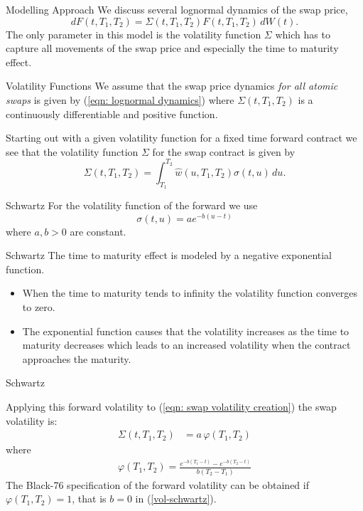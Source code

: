 {Modelling Approach}
We discuss several lognormal dynamics of the swap price,
\begin{equation}
dF(t,T_1,T_2)=\Sigma(t,T_1,T_2)F(t,T_1,T_2)\, dW(t). \label{eqn: lognormal dynamics}
\end{equation}
The only parameter in this model is the volatility function $\Sigma$ which has to capture all movements of the swap price and especially the time to maturity effect.



{Volatility Functions}
We assume that the swap price dynamics \emph{for all atomic swaps} is given by (\ref{eqn: lognormal dynamics})
where $\Sigma(t,T_1,T_2)$ is a continuously differentiable and positive function.

Starting out with a given volatility function for a fixed time forward contract we see that the volatility function $\Sigma$ for the swap contract is given by
\begin{equation}
\Sigma(t,T_1,T_2)=\int_{T_1}^{T_2} \hat{w}(u,T_1,T_2) \sigma(t,u) \, du. \label{eqn: swap volatility creation}
\end{equation}



{Schwartz}
For the volatility function of the forward we use
\begin{equation}\label{vol-schwartz}
\sigma(t,u)=a e^{-b(u-t)}
\end{equation}
where $a,b >0 $ are constant.



{Schwartz}
The time to maturity effect is modeled by a negative exponential function.
\begin{itemize}
\item<1-> When the time to maturity tends to infinity the volatility function converges to zero.
\item<2-> The exponential function causes that the volatility increases as the time to maturity decreases which leads to an increased volatility when the contract approaches the maturity.
\end{itemize}





{Schwartz}

Applying this forward volatility to (\ref{eqn: swap volatility creation}) the swap volatility is:
\begin{align}
\Sigma(t,T_1,T_2)&=a\,\varphi(T_1,T_2)
\end{align}
where
\begin{align}
\varphi(T_1,T_2)= \frac{e^{-b(T_1-t)}-e^{-b(T_2-t)}}{b(T_2-T_1)}
\label{volatility function varphi}
\end{align}
The Black-76 specification of the forward volatility can be obtained if $\varphi(T_1,T_2) =1$, that is $b=0$
in (\ref{vol-schwartz}).

